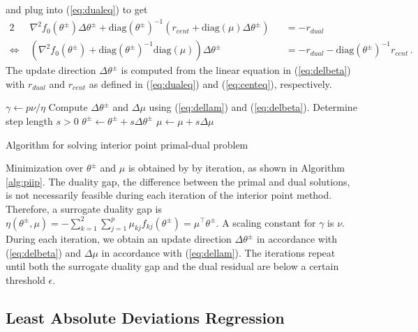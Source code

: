 \documentclass[11pt]{report}
\begin{document}
and plug into (\ref{eq:dualeq}) to get
\begin{alignat}{2}
&\nabla^2f_0(\theta^{\pm}) \Delta\theta^{\pm} + \text{diag}(\theta^{\pm})^{-1} \left( r_{cent} + \text{diag}(\mu)\Delta\theta^{\pm} \right) &&= -r_{dual}\nonumber\\ 
\Leftrightarrow \; &\left(\nabla^2f_0(\theta^{\pm}) + \text{diag}(\theta^{\pm})^{-1} \text{diag}(\mu) \right)\Delta\theta^{\pm} &&= -r_{dual} - \text{diag}(\theta^{\pm})^{-1} r_{cent}\,.\label{eq:delbeta}
\end{alignat}
The update direction $\Delta\theta^{\pm}$ is computed from the linear equation in (\ref{eq:delbeta}) with $r_{dual}$ and $r_{cent}$ as defined in (\ref{eq:dualeq}) and (\ref{eq:centeq}), respectively.

\begin{algorithm}\begingroup\fontsize{10}{10}\selectfont
\begin{algorithmic}
\State
{}
	\State $\gamma \gets p\nu/\eta$
	\State Compute $\Delta\theta^{\pm}$ and $\Delta\mu$ using (\ref{eq:dellam}) and (\ref{eq:delbeta}).
	\State Determine step length $s>0$
	\State $\theta^{\pm} \gets \theta^{\pm} + s\Delta\theta^{\pm}$
	\State $\mu \gets \mu + s\Delta\mu$
\EndWhile
\end{algorithmic}\endgroup\caption{Algorithm for solving interior point primal-dual problem}\label{alg:piip}
\end{algorithm} 

Minimization over $\theta^{\pm}$ and $\mu$ is obtained by by iteration, as shown in Algorithm \ref{alg:piip}. The duality gap, the difference between the primal and dual solutions, is not necessarily feasible during each iteration of the interior point method. Therefore, a surrogate duality gap is $\eta(\theta^{\pm}, \mu) = -\sum_{k=1}^2 \sum_{j=1}^p \mu_{kj} f_{kj}(\theta^{\pm})  = \mu^{\top} \theta^{\pm}$. A scaling constant for $\gamma$ is $\nu$. During each iteration, we obtain an update direction $\Delta\theta^{\pm}$ in accordance with (\ref{eq:delbeta}) and $\Delta\mu$ in accordance with (\ref{eq:dellam}). The iterations repeat until both the surrogate duality gap and the dual residual are below a certain threshold $\epsilon$.

\subsection{Least Absolute Deviations Regression} \label{sec:lad}
\end{document}
